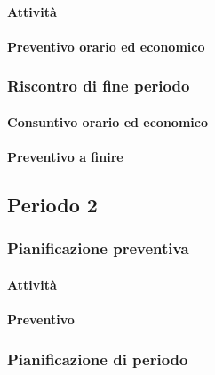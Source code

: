 
\paragraph{Attività}

\planningTable{
	
}

\paragraph{Preventivo orario ed economico}



\subsubsection{Riscontro di fine periodo}


\paragraph{Consuntivo orario ed economico}


\paragraph{Preventivo a finire}




\subsection{Periodo 2}

\subsubsection{Pianificazione preventiva}

\paragraph{Attività}

\planningTable{
	
}

\paragraph{Preventivo}

\subsubsection{Pianificazione di periodo}

